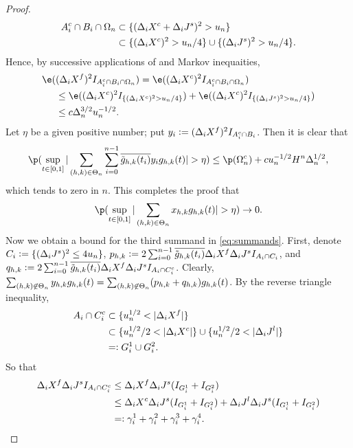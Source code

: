 \begin{proof}
\begin{align}
  \notag
  A_i^c \cap B_i \cap \Omega_n & \subset  \{ (\Delta_i X^c + \Delta_i J^s)^2 > u_n \} \notag\\
  &\subset \{(\Delta_i X^c)^2 > u_n/4\} \cup \{(\Delta_i J^s)^2 > u_n/4\}\notag .
  \label{}
\end{align}
Hence, by successive applications of \holder and Markov inequaities,   
\begin{align}
  \notag
 \e(&(\dxf)^2 I_{A_i^c \cap B_i \cap \Omega_n} ) = \e((\dxc)^2 I_{A_i^c \cap B_i \cap \Omega_n} )\notag \\
 &\le \e((\dxc)^2 I_{\{(\dxc)^2 > u_n/4\}}) + \e((\dxc)^2 I_{\{(\djt)^2 > u_n/4\}}) \label{} \notag\\
 & \le c \Delta_n^{3/2} u_n^{-1/2}.\notag
\end{align}
Let $\eta$ be a given positive number; put $y_i :=  (\Delta_i X^f)^2 I_{A_i^c \cap B_i}$. Then it is clear that
\begin{align}
  \p(\sup_{t \in \domain} \vert \sumt\sumin  \btghki y_i \ghk(t)\vert  > \eta) \le  \p(\Omega_n^c)  + c u^{-1/2}_nH^n\Delta_n^{1/2}, \notag
  \label{}
\end{align}
which tends to zero in $n$.  This completes the proof that \begin{align}\label{eq:x} \p(\sup_{t \in [0,1]}\vert \sumt x_{h,k} \ghk(t) \vert > \eta) \to 0. \end{align}
Now we obtain a bound for the third summand in  \eqref{eq:summands}. First, denote $C_i := \{( \Delta_i J^s )^2 \le 4 u_n\}$, $p_{h,k} : = 2 \sum_{i = 0}^{n-1} \overline{\tilde{g}_{h,k}(t_i)}\Delta_i X^f \Delta_i J^s I_{A_i \cap C_i}$, and $q_{h,k} := 2 \sum_{i = 0}^{n-1} \overline{\tilde{g}_{h,k}(t_i)}\Delta_i X^f \Delta_i J^s I_{A_i \cap C_i^c}$. Clearly, $\sum_{(h,k) \not\in \Theta_n} y_{h,k} g_{h,k}(t)  = \sum_{(h,k) \not\in \Theta_n} (p_{h,k} + q_{h,k}) g_{h,k}(t)$. By the reverse triangle inequality,
\begin{align}
  A_i \cap C_i^c &\subset \{ u_n^{1/2} < \vert \Delta_i X^f \vert  \}\notag\\
  & \subset \{ u_n^{1/2}/2 < \vert \Delta_i X^c \vert  \} \cup  \{ u_n^{1/2}/2 < \vert \Delta_i J^l \vert  \}\notag\\
  &=: G^1_i \cup G^2_i\notag.
  \label{}
\end{align}
So that 
\begin{align}
  \Delta_i X^f \Delta_i J^s I_{A_i \cap C_i^c} &\le \Delta_i X^f \Delta_i J^s  (I_{G^1_i} +  I_{G^2_i}) \notag\\
  & \le \Delta_i X^c \Delta_i J^s(I_{G^1_i} +  I_{G^2_i}) + \Delta_i J^l \Delta_i J^s(I_{G^1_i} +  I_{G^2_i}) \notag \\
  & =: \gamma_i^1 + \gamma_i^2 + \gamma_i^3 + \gamma^4_i.\notag 
\end{align}

\end{proof}
